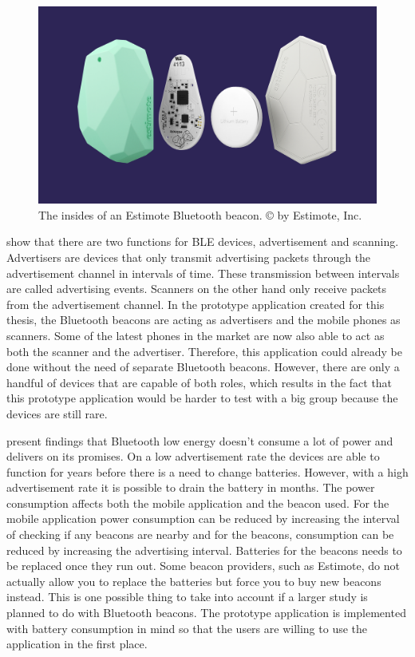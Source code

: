 \begin{figure}[htb]
	\begin{center}
		\includegraphics[width=1\textwidth]{estimote_beacons.jpg}
		\caption{The insides of an Estimote Bluetooth beacon. © by Estimote, Inc.}
	\end{center}
\end{figure}

\cite{bluetoothOverview} show that there are two functions for BLE devices, advertisement and scanning. Advertisers are devices that only transmit advertising packets through the advertisement channel in intervals of time. These transmission between intervals are called advertising events. Scanners on the other hand only receive packets from the advertisement channel. In the prototype application created for this thesis, the Bluetooth beacons are acting as advertisers and the mobile phones as scanners. Some of the latest phones in the market are now also able to act as both the scanner and the advertiser. Therefore, this application could already be done without the need of separate Bluetooth beacons. However, there are only a handful of devices that are capable of both roles, which results in the fact that this prototype application would be harder to test with a big group because the devices are still rare.

\cite{bluetoothOverview} present findings that Bluetooth low energy doesn't consume a lot of power and delivers on its promises. On a low advertisement rate the devices are able to function for years before there is a need to change batteries. However, with a high advertisement rate it is possible to drain the battery in months. The power consumption affects both the mobile application and the beacon used. For the mobile application power consumption can be reduced by increasing the interval of checking if any beacons are nearby and for the beacons, consumption can be reduced by increasing the advertising interval. Batteries for the beacons needs to be replaced once they run out. Some beacon providers, such as Estimote, do not actually allow you to replace the batteries but force you to buy new beacons instead. This is one possible thing to take into account if a larger study is planned to do with Bluetooth beacons. The prototype application is implemented with battery consumption in mind so that the users are willing to use the application in the first place.
\clearpage

